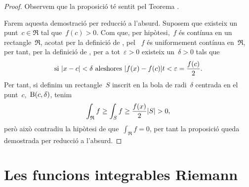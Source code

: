 \documentclass[../calcul-en-diverses-variables.tex]{subfiles}
\begin{document}
    \begin{proof}
        Observem que la proposició té sentit pel Teorema .

        Farem aquesta demostració per reducció a l'absurd.
        Suposem que existeix un punt~\(c\in \mathfrak{R}\) tal que~\(f(c)>0\).
        Com que, per hipòtesi,~\(f\) és contínua en un rectangle~\(\mathfrak{R}\), acotat per la definició de , pel ~\(f\) és uniformement contínua en~\(\mathfrak{R}\), per tant, per la definició de , per a tot~\(\varepsilon>0\) existeix un~\(\delta>0\) tals que
        \[
            \text{si }\abs{x-c}<\delta\text{ aleshores }\abs{f(x)-f(c)}t<\varepsilon=\frac{f(c)}{2}.
        \]
        Per tant, si definim un rectangle~\(S\) inscrit en la bola de radi~\(\delta\) centrada en el punt~\(c\),~\(\operatorname{B}(c,\delta)\), tenim %
        \[
            \int_{\mathfrak{R}}f\geq\int_{S}f\geq\frac{f(x)}{2}\abs{S}>0,
        \]
        però això contradiu la hipòtesi de que~\(\int_{\mathfrak{R}}f=0\), per tant la proposició queda demostrada per reducció a l'absurd.
    \end{proof}
\section{Les funcions integrables Riemann}
\end{document}
